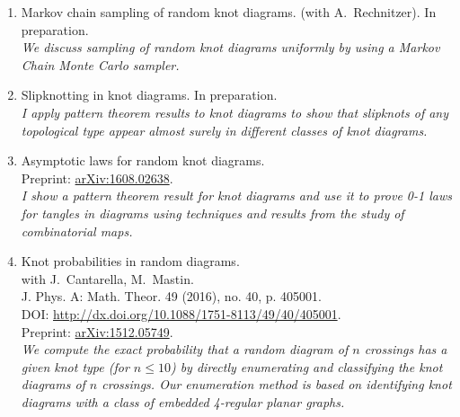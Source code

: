 \documentclass[letterpaper]{article}
\begin{document}
\begin{enumerate}
\item Markov chain sampling of random knot diagrams.
  (with A.\ Rechnitzer). In preparation.\\
  \textit{We discuss sampling of random knot diagrams uniformly by
    using a Markov Chain Monte Carlo sampler.}
\item Slipknotting in knot diagrams.
  In preparation.\\
  \textit{I apply pattern theorem results to knot diagrams to show
    that slipknots of any topological type appear almost surely in
    different classes of knot diagrams.}
\item Asymptotic laws for random knot diagrams. \\
  Preprint: \href{http://arxiv.org/abs/1608.02638}{arXiv:1608.02638}.\\
  \textit{I show a pattern theorem result for knot diagrams and use it
    to prove 0-1 laws for tangles in diagrams using techniques and
    results from the study of combinatorial maps.}
\item Knot probabilities in random diagrams.\\
  with J.\ Cantarella, M.\ Mastin. \\
  J. Phys. A: Math. Theor. 49 (2016), no. 40, p. 405001.\\
  DOI: \url{http://dx.doi.org/10.1088/1751-8113/49/40/405001}.\\
  Preprint: \href{http://arxiv.org/abs/1512.05749}{arXiv:1512.05749}.\\
  \textit{We compute the exact probability that a random diagram of
    $n$ crossings has a given knot type (for $n \leq 10$) by directly
    enumerating and classifying the knot diagrams of $n$
    crossings. Our enumeration method is based on identifying knot
    diagrams with a class of embedded 4-regular planar graphs.}

\end{enumerate}
\end{document}

